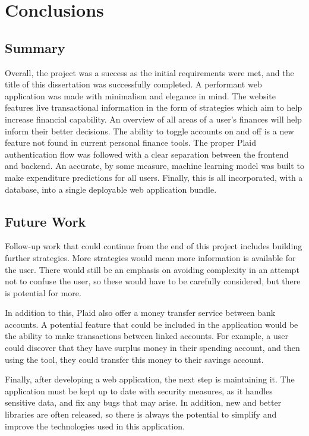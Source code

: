 \chapter{Conclusions}
\label{ch:conclusions}

\section{Summary}
Overall, the project was a success as the initial requirements were met, and the title of this dissertation was successfully completed. A performant web application was made with minimalism and elegance in mind. The website features live transactional information in the form of strategies which aim to help increase financial capability. An overview of all areas of a user's finances will help inform their better decisions. The ability to toggle accounts on and off is a new feature not found in current personal finance tools. The proper Plaid authentication flow was followed with a clear separation between the frontend and backend. An accurate, by some measure, machine learning model was built to make expenditure predictions for all users. Finally, this is all incorporated, with a database, into a single deployable web application bundle.

\section{Future Work}
Follow-up work that could continue from the end of this project includes building further strategies. More strategies would mean more information is available for the user. There would still be an emphasis on avoiding complexity in an attempt not to confuse the user, so these would have to be carefully considered, but there is potential for more.

In addition to this, Plaid also offer a money transfer service between bank accounts. A potential feature that could be included in the application would be the ability to make transactions between linked accounts. For example, a user could discover that they have surplus money in their spending account, and then using the tool, they could transfer this money to their savings account.

Finally, after developing a web application, the next step is maintaining it. The application must be kept up to date with security measures, as it handles sensitive data, and fix any bugs that may arise. In addition, new and better libraries are often released, so there is always the potential to simplify and improve the technologies used in this application.